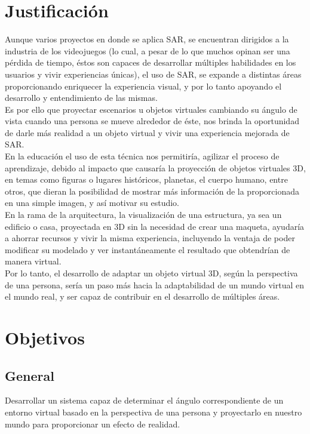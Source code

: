 \documentclass[a4paper,openright,12pt]{report}
\begin{document}
\section{Justificación}
Aunque varios proyectos en donde se aplica SAR, se encuentran dirigidos a la industria de los videojuegos (lo cual, a pesar de lo que muchos opinan ser una pérdida de tiempo, éstos son capaces de desarrollar múltiples habilidades en los usuarios y vivir experiencias únicas), el uso de SAR, se expande a distintas áreas proporcionando enriquecer la experiencia visual, y por lo tanto apoyando el desarrollo y entendimiento de las mismas.\\
Es por ello que proyectar escenarios u objetos virtuales cambiando su ángulo de vista cuando una persona se mueve alrededor de éste, nos brinda la oportunidad de darle más realidad a un objeto virtual y vivir una experiencia mejorada de SAR.\\
En la educación el uso de esta técnica nos permitiría, agilizar el proceso de aprendizaje, debido al impacto que causaría la proyección de objetos virtuales 3D, en temas como figuras o lugares históricos, planetas, el cuerpo humano, entre otros, que dieran la posibilidad de mostrar más información de la proporcionada en una simple imagen, y así motivar su estudio.\\
En la rama de la arquitectura, la visualización de una estructura, ya sea un edificio o casa, proyectada en 3D sin la necesidad de crear una maqueta, ayudaría a ahorrar recursos y vivir la misma experiencia, incluyendo la ventaja de poder modificar su modelado y ver instantáneamente el resultado que obtendrían de manera virtual.\\
Por lo tanto, el desarrollo de adaptar un objeto virtual 3D, según la perspectiva de una persona, sería un paso más hacia la adaptabilidad de un mundo virtual en el mundo real, y ser capaz de contribuir en el desarrollo de múltiples áreas.

\section{Objetivos}
\subsection{General}
Desarrollar un sistema capaz de determinar el ángulo correspondiente de un entorno virtual basado en la perspectiva de una persona y proyectarlo en nuestro mundo para proporcionar un efecto de realidad.
%
\end{document}
